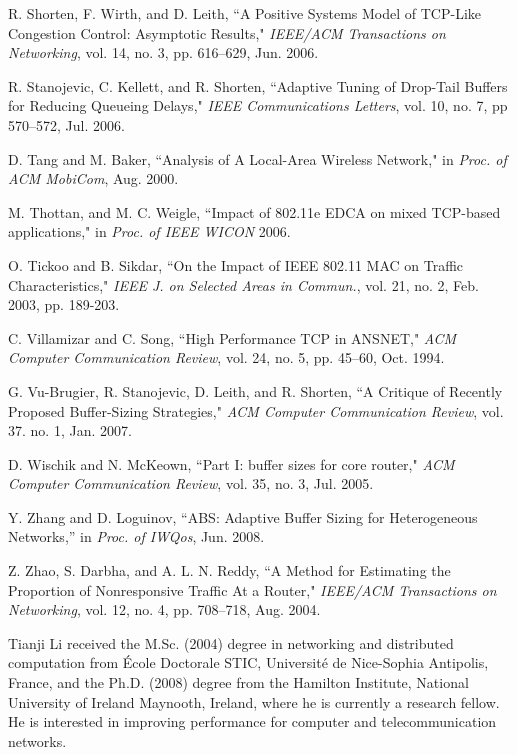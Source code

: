 \documentclass[10pt,twocolumn, journal]{IEEEtran}
\begin{document}
\begin{thebibliography}{}
R. Shorten, F. Wirth, and D. Leith, ``A Positive Systems Model of TCP-Like Congestion
Control: Asymptotic Results," \emph{IEEE/ACM Transactions on Networking}, vol. 14, no. 3,
pp. 616--629, Jun. 2006.

R. Stanojevic, C. Kellett, and R. Shorten, ``Adaptive Tuning of Drop-Tail Buffers for
Reducing Queueing Delays," \emph{IEEE Communications Letters}, vol. 10, no. 7, pp
570--572, Jul. 2006.

D. Tang and M. Baker, ``Analysis of A Local-Area Wireless Network," in \emph{Proc. of ACM
MobiCom}, Aug. 2000.


M. Thottan, and M. C. Weigle, ``Impact of 802.11e EDCA on mixed TCP-based applications,"
in \emph{Proc. of IEEE WICON} 2006.


O. Tickoo and B. Sikdar, ``On the Impact of IEEE 802.11 MAC on Traffic Characteristics,"
\emph{IEEE J. on Selected Areas in Commun.}, vol. 21, no. 2, Feb. 2003, pp. 189-203.



C. Villamizar and C. Song, ``High Performance TCP in ANSNET," \emph{ACM Computer
Communication Review}, vol. 24, no. 5, pp. 45--60, Oct. 1994.

G. Vu-Brugier, R. Stanojevic, D. Leith, and R. Shorten, ``A Critique of Recently Proposed
Buffer-Sizing Strategies," \emph{ACM Computer Communication Review}, vol. 37. no. 1, Jan.
2007.

D. Wischik and N. McKeown, ``Part I: buffer sizes for core router," \emph{ACM Computer
Communication Review}, vol. 35, no. 3, Jul. 2005.


Y. Zhang and D. Loguinov, ``ABS: Adaptive Buffer Sizing for Heterogeneous Networks,'' in \emph{Proc. of IWQos}, Jun. 2008.


Z. Zhao, S. Darbha, and A. L. N. Reddy, ``A Method for Estimating the Proportion of
Nonresponsive Traffic At a Router," \emph{IEEE/ACM Transactions on Networking}, vol. 12,
no. 4, pp. 708--718, Aug. 2004.

\end{thebibliography}





\begin{IEEEbiography}{Tianji Li}
received the M.Sc. (2004) degree in networking and
distributed computation from \'{E}cole Doctorale STIC,
Universit\'{e} de Nice-Sophia Antipolis, France, and the  Ph.D. (2008) degree from the Hamilton
Institute, National University of Ireland Maynooth, Ireland, where he is currently a research fellow. He is interested in improving performance for computer and telecommunication networks.
\end{IEEEbiography}
\end{document}
